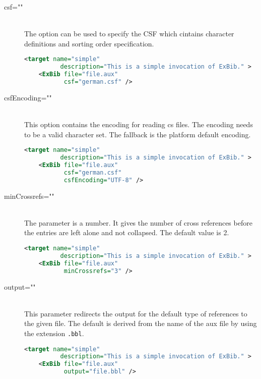 \begin{description}
\item[csf=""] \ \\
  The option can be used to specify the CSF which cintains character
  definitions and sorting order specification.

\begin{lstlisting}[language=XML,morekeywords={target}]
  <target name="simple"
          description="This is a simple invocation of ExBib." >
    <ExBib file="file.aux"
           csf="german.csf" />
\end{lstlisting}

\item[csfEncoding=""] \ \\
  This option contains the encoding for reading cs files. The encoding
  needs to be a valid character set. The fallback is the platform
  default encoding.

\begin{lstlisting}[language=XML,morekeywords={target}]
  <target name="simple"
          description="This is a simple invocation of ExBib." >
    <ExBib file="file.aux"
           csf="german.csf" 
           csfEncoding="UTF-8" />
\end{lstlisting}

\item[minCrossrefs=""] \ \\
  The parameter is a number. It gives the number of cross references
  before the entries are left alone and not collapsed. The default
  value is 2.

\begin{lstlisting}[language=XML,morekeywords={target}]
  <target name="simple"
          description="This is a simple invocation of ExBib." >
    <ExBib file="file.aux"
           minCrossrefs="3" />
\end{lstlisting}

\item[output=""] \ \\
  This parameter redirects the output for the default type of
  references to the given file. The default is derived from the name
  of the aux file by using the extension \texttt{.bbl}.

\begin{lstlisting}[language=XML,morekeywords={target}]
  <target name="simple"
          description="This is a simple invocation of ExBib." >
    <ExBib file="file.aux"
           output="file.bbl" />
\end{lstlisting}


\end{description}
